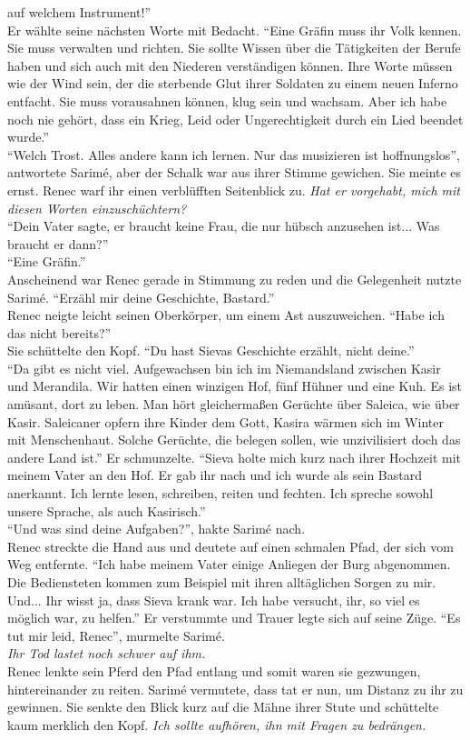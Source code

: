 auf welchem Instrument!''\\
Er wählte seine nächsten Worte mit Bedacht. ``Eine Gräfin muss ihr Volk kennen. Sie muss verwalten 
und richten. Sie sollte Wissen über die Tätigkeiten der Berufe haben und sich auch mit den Niederen 
verständigen können. Ihre Worte müssen wie der Wind sein, der die sterbende Glut ihrer Soldaten zu 
einem neuen Inferno entfacht. Sie muss vorausahnen können, klug sein und wachsam. Aber ich habe 
noch nie gehört, dass ein Krieg, Leid oder Ungerechtigkeit durch ein Lied beendet wurde.''\\
``Welch Trost. Alles andere kann ich lernen. Nur das musizieren ist hoffnungslos'', antwortete 
Sarimé, aber der Schalk war aus ihrer Stimme gewichen. Sie meinte es ernst. Renec warf ihr einen 
verblüfften Seitenblick zu. \textit{Hat er vorgehabt, mich mit diesen Worten einzuschüchtern?}\\
``Dein Vater sagte, er braucht keine Frau, die nur hübsch anzusehen ist... Was braucht er dann?''\\
``Eine Gräfin.''\\
Anscheinend war Renec gerade in Stimmung zu reden und die Gelegenheit nutzte Sarimé. ``Erzähl mir 
deine Geschichte, Bastard.''\\
Renec neigte leicht seinen Oberkörper, um einem Ast auszuweichen. ``Habe ich das nicht bereits?''\\
Sie schüttelte den Kopf. ``Du hast Sievas Geschichte erzählt, nicht deine.''\\
``Da gibt es nicht viel. Aufgewachsen bin ich im Niemandsland zwischen Kasir und Merandila. Wir 
hatten einen winzigen Hof, fünf Hühner und eine Kuh. Es ist amüsant, dort zu leben. Man hört 
gleichermaßen Gerüchte über Saleica, wie über Kasir. Saleicaner opfern ihre Kinder dem Gott, Kasira 
wärmen sich im Winter mit Menschenhaut. Solche Gerüchte, die belegen sollen, wie unzivilisiert doch 
das andere Land ist.'' Er schmunzelte. ``Sieva holte mich kurz nach ihrer Hochzeit mit meinem Vater 
an den Hof. Er gab ihr nach und ich wurde als sein Bastard anerkannt. Ich lernte lesen, schreiben, 
reiten und fechten. Ich spreche sowohl unsere Sprache, als auch Kasirisch.''\\
``Und was sind deine Aufgaben?'', hakte Sarimé nach.\\
Renec streckte die Hand aus und deutete auf einen schmalen Pfad, der sich vom Weg entfernte. ``Ich 
habe meinem Vater einige Anliegen der Burg abgenommen. Die Bediensteten kommen zum Beispiel mit 
ihren alltäglichen Sorgen zu mir. Und... Ihr wisst ja, dass Sieva krank war. Ich habe versucht, 
ihr, so viel es möglich war, zu helfen.'' Er verstummte und Trauer legte sich auf seine Züge.
``Es tut mir leid, Renec'', murmelte Sarimé.\\
\textit{Ihr Tod lastet noch schwer auf ihm.}\\
Renec lenkte sein Pferd den Pfad entlang und somit waren sie gezwungen, hintereinander zu reiten. 
Sarimé vermutete, dass tat er nun, um Distanz zu ihr zu gewinnen. Sie senkte den Blick kurz auf die 
Mähne ihrer Stute und schüttelte kaum merklich den Kopf. \textit{Ich sollte aufhören, ihn mit 
Fragen zu bedrängen.}\\


